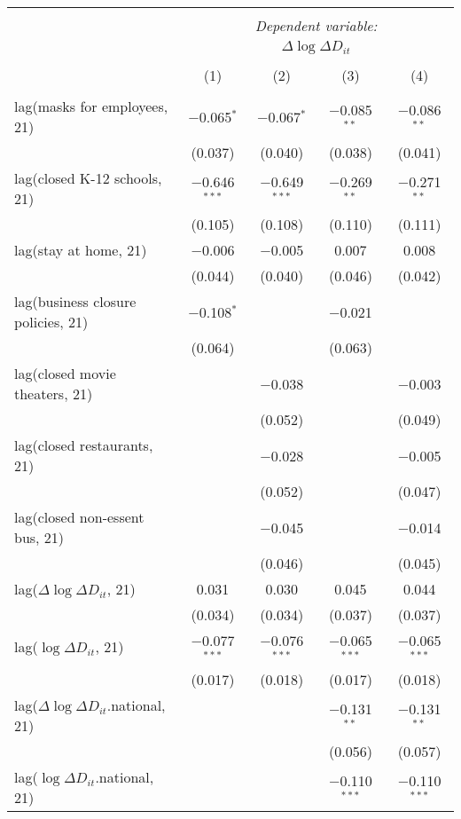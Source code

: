 \begin{tabular}{@{\extracolsep{1pt}}lcccc} 
\\[-1.8ex]\hline 
\hline \\[-1.8ex] 
 & \multicolumn{4}{c}{\textit{Dependent variable:}} \\ 
\cline{2-5} 
 & \multicolumn{4}{c}{$\Delta \log \Delta D_{it}$} \\ 
\\[-1.8ex] & (1) & (2) & (3) & (4)\\ 
\hline \\[-1.8ex] 
 lag(masks for employees, 21) & $-$0.065$^{*}$ & $-$0.067$^{*}$ & $-$0.085$^{**}$ & $-$0.086$^{**}$ \\ 
  & (0.037) & (0.040) & (0.038) & (0.041) \\ 
  lag(closed K-12 schools, 21) & $-$0.646$^{***}$ & $-$0.649$^{***}$ & $-$0.269$^{**}$ & $-$0.271$^{**}$ \\ 
  & (0.105) & (0.108) & (0.110) & (0.111) \\ 
  lag(stay at home, 21) & $-$0.006 & $-$0.005 & 0.007 & 0.008 \\ 
  & (0.044) & (0.040) & (0.046) & (0.042) \\ 
  lag(business closure policies, 21) & $-$0.108$^{*}$ &  & $-$0.021 &  \\ 
  & (0.064) &  & (0.063) &  \\ 
  lag(closed movie theaters, 21) &  & $-$0.038 &  & $-$0.003 \\ 
  &  & (0.052) &  & (0.049) \\ 
  lag(closed restaurants, 21) &  & $-$0.028 &  & $-$0.005 \\ 
  &  & (0.052) &  & (0.047) \\ 
  lag(closed non-essent bus, 21) &  & $-$0.045 &  & $-$0.014 \\ 
  &  & (0.046) &  & (0.045) \\ 
  lag($\Delta \log \Delta D_{it}$, 21) & 0.031 & 0.030 & 0.045 & 0.044 \\ 
  & (0.034) & (0.034) & (0.037) & (0.037) \\ 
  lag($\log \Delta D_{it}$, 21) & $-$0.077$^{***}$ & $-$0.076$^{***}$ & $-$0.065$^{***}$ & $-$0.065$^{***}$ \\ 
  & (0.017) & (0.018) & (0.017) & (0.018) \\ 
  lag($\Delta \log \Delta D_{it}$.national, 21) &  &  & $-$0.131$^{**}$ & $-$0.131$^{**}$ \\ 
  &  &  & (0.056) & (0.057) \\ 
  lag($\log \Delta D_{it}$.national, 21) &  &  & $-$0.110$^{***}$ & $-$0.110$^{***}$ \\ 

\end{tabular}
